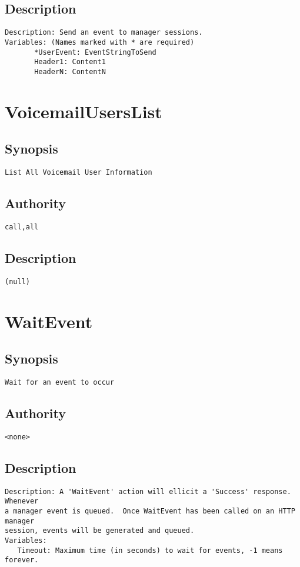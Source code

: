 \subsection{Description}
\begin{verbatim}
Description: Send an event to manager sessions.
Variables: (Names marked with * are required)
       *UserEvent: EventStringToSend
       Header1: Content1
       HeaderN: ContentN

\end{verbatim}


\section{VoicemailUsersList}
\subsection{Synopsis}
\begin{verbatim}
List All Voicemail User Information
\end{verbatim}
\subsection{Authority}
\begin{verbatim}
call,all
\end{verbatim}
\subsection{Description}
\begin{verbatim}
(null)
\end{verbatim}


\section{WaitEvent}
\subsection{Synopsis}
\begin{verbatim}
Wait for an event to occur
\end{verbatim}
\subsection{Authority}
\begin{verbatim}
<none>
\end{verbatim}
\subsection{Description}
\begin{verbatim}
Description: A 'WaitEvent' action will ellicit a 'Success' response.  Whenever
a manager event is queued.  Once WaitEvent has been called on an HTTP manager
session, events will be generated and queued.
Variables: 
   Timeout: Maximum time (in seconds) to wait for events, -1 means forever.

\end{verbatim}


